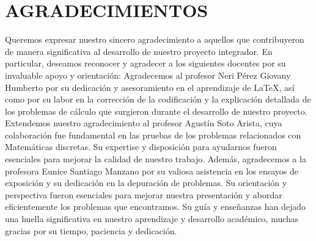 \documentclass{IEEEcsmag}
\begin{document}
\section{AGRADECIMIENTOS}
Queremos expresar nuestro sincero agradecimiento a aquellos que contribuyeron de manera significativa al desarrollo de nuestro proyecto integrador. En particular, deseamos reconocer y agradecer a los siguientes docentes por su invaluable apoyo y orientación:
Agradecemos al profesor Neri Pérez Giovany Humberto por su dedicación y asesoramiento en el aprendizaje de LaTeX, así como por su labor en la corrección de la codificación y la explicación detallada de los problemas de cálculo que surgieron durante el desarrollo de nuestro proyecto.
Extendemos nuestro agradecimiento al profesor Agustín Soto Arista, cuya colaboración fue fundamental en las pruebas de los problemas relacionados con Matemáticas discretas. Su expertise y disposición para ayudarnos fueron esenciales para mejorar la calidad de nuestro trabajo.
Además, agradecemos a la profesora Eunice Santiago Manzano por su valiosa asistencia en los ensayos de exposición y su dedicación en la depuración de problemas. Su orientación y perspectiva fueron esenciales para mejorar nuestra presentación y abordar eficientemente los problemas que encontramos.
Su guía y enseñanzas han dejado una huella significativa en nuestro aprendizaje y desarrollo académico, muchas gracias por su tiempo, paciencia y dedicación.

\def\refname{REFERENCES}
\end{document}
